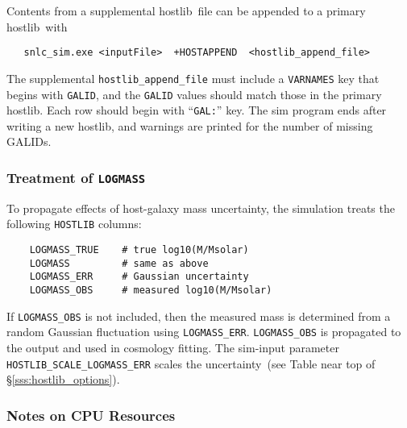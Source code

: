 \documentclass[12pt]{article}
\newcommand{\unc}{uncertainty}
\newcommand{\hostlib}{{\sc hostlib}}
\begin{document}
{Contents from a supplemental \hostlib\ file can be appended to a
primary \hostlib\ with
\begin{verbatim}
   snlc_sim.exe <inputFile>  +HOSTAPPEND  <hostlib_append_file>
\end{verbatim} 
The supplemental {\tt hostlib\_append\_file} must include a
{\tt VARNAMES} key that begins with {\tt GALID}, and the
{\tt GALID} values should match those in the primary \hostlib.
Each row should begin with ``{\tt GAL:}'' key. 
The sim program ends after writing a new \hostlib,
and warnings are printed for the number of missing GALIDs.

\subsubsection{Treatment of {\tt LOGMASS} }
\label{sss:hostlib_logmass}

To propagate effects of  host-galaxy mass \unc,
the simulation treats the following {\tt HOSTLIB} columns:
%
\begin{Verbatim}
    LOGMASS_TRUE    # true log10(M/Msolar)
    LOGMASS         # same as above
    LOGMASS_ERR     # Gaussian uncertainty
    LOGMASS_OBS     # measured log10(M/Msolar)
\end{Verbatim}
%
If {\tt LOGMASS\_OBS} is not included, then the measured
mass is determined from a random Gaussian fluctuation
using {\tt LOGMASS\_ERR}. {\tt LOGMASS\_OBS} is propagated
to the output and used in cosmology fitting.
The sim-input parameter {\tt HOSTLIB\_SCALE\_LOGMASS\_ERR} scales 
the \unc\
(see Table near top of \S\ref{sss:hostlib_options}).



\subsubsection{Notes on CPU Resources}
\label{sss:hostlib_CPU}

}
\end{document}

